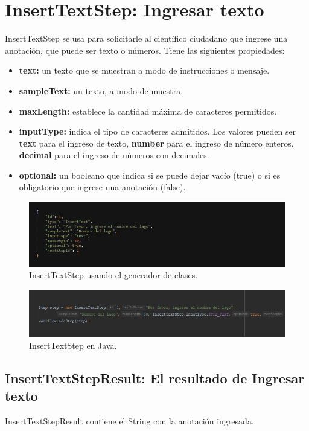 \section{InsertTextStep: Ingresar texto}
InsertTextStep se usa para solicitarle al científico ciudadano que ingrese una anotación, que puede ser texto o números. Tiene las siguientes propiedades:

\begin{itemize}
\item \textbf{text:} un texto que se muestran a modo de instrucciones o mensaje.
\item \textbf{sampleText:} un texto, a modo de muestra.
\item \textbf{maxLength:} establece la cantidad máxima de caracteres permitidos.
\item \textbf{inputType:} indica el tipo de caracteres admitidos. Los valores pueden ser \textbf{text} para el ingreso de texto, \textbf{number} para el ingreso de número enteros, \textbf{decimal} para el ingreso de números con decimales.
\item \textbf{optional:} un booleano que indica si se puede dejar vacío (true) o si es obligatorio que ingrese una anotación (false).
\end{itemize}

\begin{figure}[H]
  \centering
    \includegraphics[scale=0.6]{50-anexos/C-steps/insert_text_json.png} 
    \caption{InsertTextStep usando el generador de clases.}
\end{figure}	

\begin{figure}[H]
  \centering
    \includegraphics[scale=0.6]{50-anexos/C-steps/insert_text_java.png} 
    \caption{InsertTextStep en Java.}
\end{figure}


\subsection{InsertTextStepResult: El resultado de Ingresar texto}
InsertTextStepResult contiene el String con la anotación ingresada.





